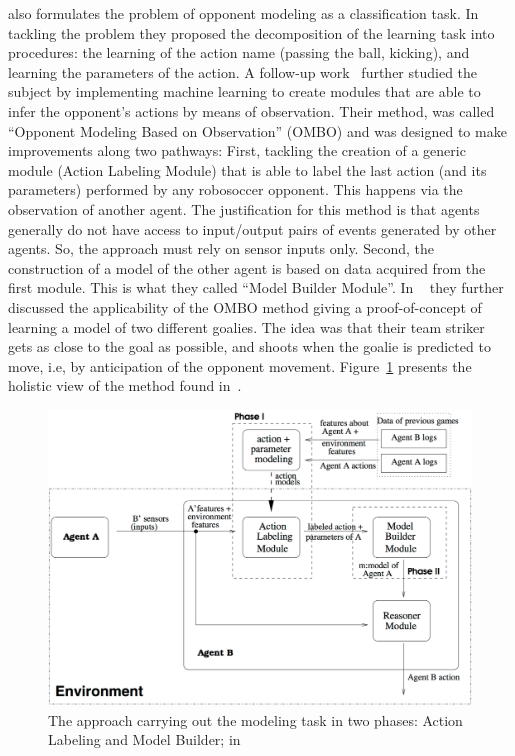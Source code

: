 \cite{ledezma_predicting_2002} also formulates the problem of opponent modeling as a classification task. In tackling the problem they proposed the decomposition of the learning task into procedures: the learning of the action name (passing the ball, kicking), and learning the parameters of the action. A follow-up work~\cite{ledezma_predicting_2005} further studied the subject by implementing machine learning to create modules that are able to infer the opponent's actions by means of observation. Their method, was called ``Opponent Modeling Based on Observation'' (OMBO) and was designed to make improvements along two pathways: First, tackling the creation of a generic module (Action Labeling Module) that is able to label the last action (and its parameters) performed by any robosoccer opponent. This happens via the observation of another agent. The justification for this method is that agents generally do not have access to input/output pairs of events generated by other agents. So, the approach must rely on sensor inputs only. Second, the construction of a model of the other agent is based on data acquired from the first module. This is what they called ``Model Builder Module''. In ~\cite{ledezma_ombo:_2009} they further discussed the applicability of the OMBO method giving a proof-of-concept of learning a model of two different goalies. The idea was that their team striker gets as close to the goal as possible, and shoots when the goalie is predicted to move, i.e, by anticipation of the opponent movement. Figure~\ref{OMBO_model_task} presents the holistic view of the method found in~\cite{ledezma_predicting_2005,ledezma_ombo:_2009}. 

\begin{figure}[htp]
  \centering  
  \includegraphics[draft=false, width=\textwidth]{images/04-competition/OMBO_model_task.png}
  \caption{The approach carrying out the modeling task in two phases: Action Labeling and Model Builder; in~\citet{ledezma_predicting_2005,ledezma_ombo:_2009}}
    \label{OMBO_model_task}
\end{figure}

